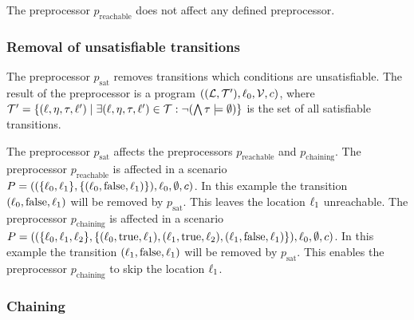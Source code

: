 The preprocessor $p_{\text{reachable}}$ does not affect any defined preprocessor.

\subsubsection{Removal of unsatisfiable transitions}

The preprocessor $p_{\text{sat}}$ removes transitions which conditions are unsatisfiable.
The result of the preprocessor is a program $((\mathcal{L}, \mathcal{T}'), \ell_0, \mathcal{V}, c)$, where $\mathcal{T}' = \lbrace (\ell,\eta,\tau,\ell') \mid \exists (\ell,\eta,\tau,\ell') \in \mathcal{T}: \neg (\bigwedge \tau \models \emptyset) \rbrace$ is the set of all satisfiable transitions.

The preprocessor $p_{\text{sat}}$ affects the preprocessors $p_{\text{reachable}}$ and $p_{\text{chaining}}$.
The preprocessor $p_{\text{reachable}}$ is affected in a scenario $P = ((\lbrace \ell_0, \ell_1 \rbrace, \lbrace (\ell_0,\text{false},\ell_1) \rbrace), \ell_0, \emptyset, c)$.
In this example the transition $(\ell_0,\text{false},\ell_1)$ will be removed by $p_{\text{sat}}$.
This leaves the location $\ell_1$ unreachable.
The preprocessor $p_{\text{chaining}}$ is affected in a scenario $P = ((\lbrace \ell_0, \ell_1, \ell_2 \rbrace, \lbrace (\ell_0,\text{true},\ell_1), (\ell_1,\text{true},\ell_2), (\ell_1,\text{false},\ell_1) \rbrace), \ell_0, \emptyset, c)$.
In this example the transition $(\ell_1,\text{false},\ell_1)$ will be removed by $p_{\text{sat}}$.
This enables the preprocessor $p_{\text{chaining}}$ to skip the location $\ell_1$.

\subsubsection{Chaining}

